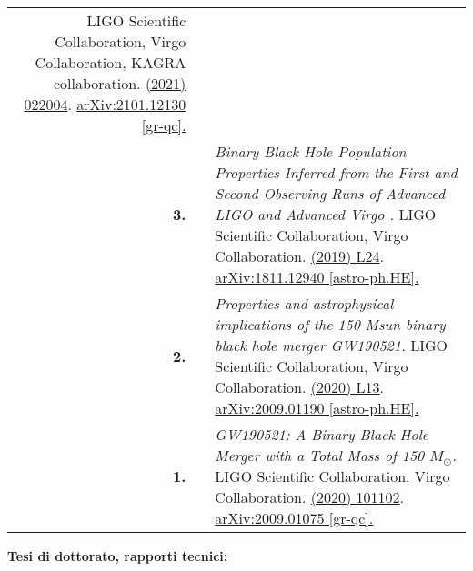{\begin{longtable}{rp{0.3cm}p{15.8cm}}
\newline{}
LIGO Scientific Collaboration, Virgo Collaboration, KAGRA collaboration.
\newline{}
\href{https://journals.aps.org/prd/abstract/10.1103/PhysRevD.104.022004}{\prd 104 (2021) 022004}. \href{https://arxiv.org/abs/2101.12130}{arXiv:2101.12130 [gr-qc].}
\vspace{0.09cm}\\
%
\textbf{3.} & & \textit{Binary Black Hole Population Properties Inferred from the First and Second Observing Runs of Advanced LIGO and Advanced Virgo .}
\newline{}
LIGO Scientific Collaboration, Virgo Collaboration.
\newline{}
\href{https://iopscience.iop.org/article/10.3847/2041-8213/ab3800}{\apj 882 (2019)  L24}. \href{https://arxiv.org/abs/1811.12940}{arXiv:1811.12940 [astro-ph.HE].}
\vspace{0.09cm}\\
%
\textbf{2.} & & \textit{Properties and astrophysical implications of the 150 Msun binary black hole merger GW190521.}
\newline{}
LIGO Scientific Collaboration, Virgo Collaboration.
\newline{}
\href{https://iopscience.iop.org/article/10.3847/2041-8213/aba493}{\apjl 900 (2020) L13}. \href{https://arxiv.org/abs/2009.01190}{arXiv:2009.01190 [astro-ph.HE].}
\vspace{0.09cm}\\
%
\textbf{1.} & & \textit{GW190521: A Binary Black Hole Merger with a Total Mass of 150 $M_\odot$.}
\newline{}
LIGO Scientific Collaboration, Virgo Collaboration.
\newline{}
\href{https://journals.aps.org/prl/abstract/10.1103/PhysRevLett.125.101102}{\prl 125 (2020) 101102}. \href{https://arxiv.org/abs/2009.01075}{arXiv:2009.01075 [gr-qc].}
\vspace{0.09cm}\\
%
\end{longtable} }
\textcolor{color1}{\textbf{Tesi di dottorato, rapporti tecnici:}}
\vspace{-0.5cm}

